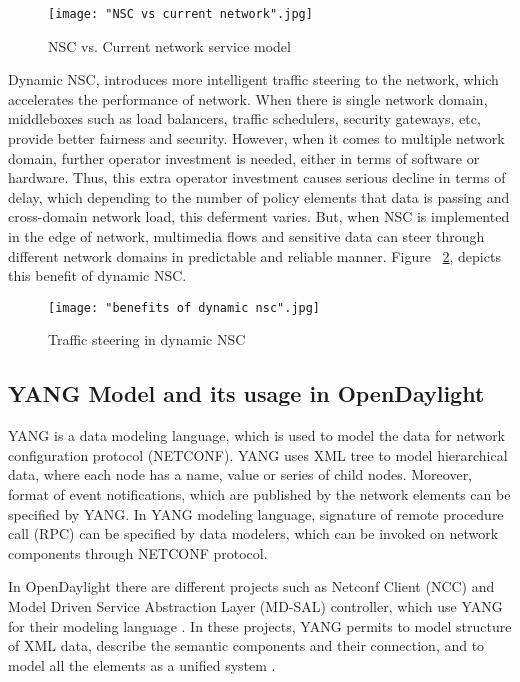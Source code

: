 \documentclass[english]{tktltiki2}
\theoremstyle{definition}
\theoremstyle{remark}
\begin{document}
\begin{figure}[h!]
\centering
{}
\texttt{[image: "NSC vs current network".jpg]}
\caption{NSC vs. Current network service model \cite{Wol13}}
\label{fig:NSC}
\end{figure}

Dynamic NSC, introduces more intelligent traffic steering to the network, which accelerates the performance of network. When there is single network domain, middleboxes such as load balancers, traffic schedulers, security gateways, etc, provide better fairness and  security. However, when it comes to multiple network domain, further operator investment is needed, either in terms of software or hardware. Thus, this extra operator investment causes serious decline in terms of delay, which depending to the number of policy elements that data is passing and cross-domain network load, this deferment varies. But, when NSC is implemented in the edge of network, multimedia flows and sensitive data can steer through different network domains in predictable and reliable manner. Figure ~\ref{fig:NSCbenefit}, depicts this benefit of dynamic NSC. 


\begin{figure}[h!]
\centering
{}
\texttt{[image: "benefits of dynamic nsc".jpg]}
\caption{Traffic steering in dynamic NSC \cite{Wol13}}
\label{fig:NSCbenefit}
\end{figure}

\subsection{YANG Model and its usage in OpenDaylight}

YANG is a data modeling language, which is used to model the data for network configuration protocol (NETCONF). YANG uses XML tree to model hierarchical data, where each node has a name, value or series of child nodes. Moreover, format of event notifications, which are published by the network elements can be specified by YANG. In YANG modeling language, signature of remote procedure call (RPC) can be specified by data modelers, which can be invoked on network components through NETCONF protocol. \cite{Bjo10}

In OpenDaylight there are different projects such as Netconf Client (NCC) and Model Driven Service Abstraction Layer (MD-SAL) controller, which use YANG for their modeling language \cite{MDS} \cite{Netconf}. In these projects, YANG permits to model structure of XML data, describe the semantic components and their connection, and to model all the elements as a unified system \cite{MDS}.
\end{document}
